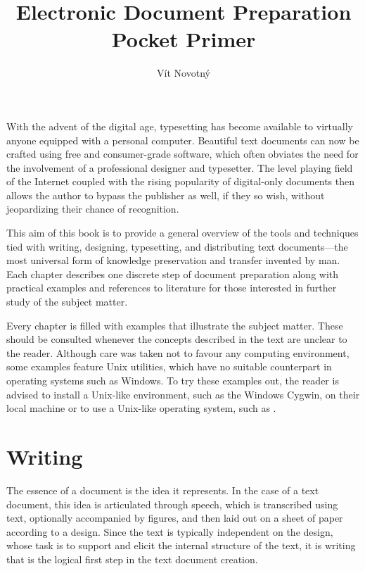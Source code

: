 \documentclass[a5paper,10pt]{book}
\begin{document}
\frontmatter
\title{Electronic Document Preparation\\Pocket Primer}
\author{Vít Novotný}
\maketitle
\tableofcontents
\mainmatter
{}
With the advent of the digital age, typesetting has become available to
virtually anyone equipped with a personal computer. Beautiful text documents can
now be crafted using free and consumer-grade software, which often obviates the
need for the involvement of a professional designer and typesetter. The level
playing field of the Internet coupled with the rising popularity of digital-only
documents then allows the author to bypass the publisher as well, if they so
wish, without jeopardizing their chance of recognition.

This aim of this book is to provide a general overview of the tools and
techniques tied with writing, designing, typesetting, and distributing text
documents---the most universal form of knowledge preservation and transfer
invented by man. Each chapter describes one discrete step of document
preparation along with practical examples and references to literature for those
interested in further study of the subject matter.

Every chapter is filled with examples that illustrate the subject matter. These
should be consulted whenever the concepts described in the text are unclear to
the reader. Although care was taken not to favour any computing environment,
some examples feature Unix utilities, which have no suitable counterpart in
operating systems such as Windows. To try these examples out, the reader is
advised to install a Unix-like environment, such as the Windows Cygwin, on their
local machine or to use a Unix-like operating system, such as \Linux.

\chapter{Writing}
The essence of a document is the idea it represents. In the case of a text
document, this idea is articulated through speech, which is transcribed using
text, optionally accompanied by figures, and then laid out on a sheet of paper
according to a design. Since the text is typically independent on the design,
whose task is to support and elicit the internal structure of the text, it is
writing that is the logical first step in the text document creation.
\end{document}
